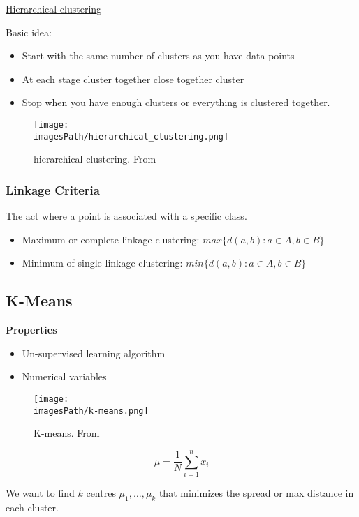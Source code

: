 \href{https://www.youtube.com/watch?v=7xHsRkOdVwo}{Hierarchical clustering}

Basic idea:
\begin{itemize}
    \item Start with the same number of clusters as you have data points
    \item At each stage cluster together close together cluster 
    \item Stop when you have enough clusters or everything is clustered together.
\end{itemize}

\begin{figure}[!h]
    \centering
    \texttt{[image: \\imagesPath/hierarchical\_clustering.png]}
    \caption{hierarchical clustering. From \cite{}}
\end{figure}

\subsubsection{Linkage Criteria}
The act where a point is associated with a specific class.
\begin{itemize}
    \item Maximum or complete linkage clustering:
    $max\{ d(a,b): a\in A, b\in B\}$
    \item Minimum of single-linkage clustering:
    $min\{ d(a,b): a\in A, b\in B\}$
\end{itemize}

\subsection{K-Means}
\textbf{Properties}
\begin{itemize}
    \item Un-supervised learning algorithm
    \item Numerical variables 
\end{itemize}
\begin{figure}[!h]
    \centering
    \texttt{[image: \\imagesPath/k-means.png]}
    \caption{K-means. From \cite{}}
\end{figure}

\begin{equation*}
    \mu = \frac{1}{N} \sum_{i=1}^{n} x_i
\end{equation*}

We want to find $k$ centres $\mu_1,\ldots,\mu_k$ that minimizes the spread or max 
distance in each cluster. 

